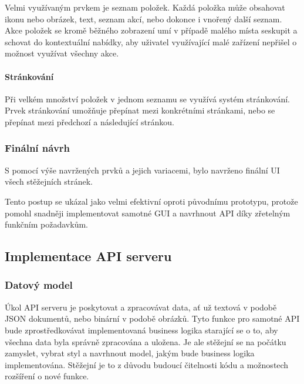 			Velmi využívaným prvkem je seznam položek.
			Každá položka může obsahovat ikonu nebo obrázek, text, seznam akcí, nebo dokonce i vnořený další seznam.
			Akce položek se kromě běžného zobrazení umí v případě malého místa seskupit a schovat do kontextuální
			nabídky, aby uživatel využívající malé zařízení nepřišel o možnost využívat všechny akce.


			\paragraph{Stránkování}

			Při velkém množství položek v jednom seznamu se využívá systém stránkování.
			Prvek stránkování umožňuje přepínat mezi konkrétními stránkami, nebo se přepínat mezi předchozí a následující stránkou.


		\subsubsection{Finální návrh}

		S pomocí výše navržených prvků a jejich variacemi, bylo navrženo finální \ac{UI} všech stěžejních
		stránek.


		Tento postup se ukázal jako velmi efektivní oproti původnímu prototypu, protože
		pomohl snadněji implementovat samotné \ac{GUI} a navrhnout \ac{API} díky zřetelným funkčním požadavkům.

	\subsection{Implementace API serveru}

		\subsubsection{Datový model}

		Úkol \ac{API} serveru je poskytovat a zpracovávat data, ať už textová v podobě \ac{JSON} dokumentů, nebo binární v podobě
		obrázků.
		Tyto funkce pro samotné API bude zprostředkovávat implementovaná business logika starající se o to, aby všechna data
		byla správně zpracována a uložena.
		Je ale stěžejní se na počátku zamyslet, vybrat styl a navrhnout model, jakým bude business logika implementována.
		Stěžejní je to z důvodu budoucí čitelnosti kódu a možnostech rozšíření o nové funkce.

